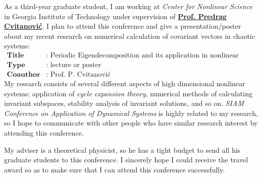 \documentclass[10pt,stdletter,dateno,sigleft]{newlfm} %
\begin{document}
\begin{newlfm}

As a third-year graduate student, I am working at \textit{Center for Nonlinear Science} 
in Georgia Institute of Technology under supervision of  
\href{http://www.cns.gatech.edu/~predrag/}{\textbf{Prof. Predrag Cvitanovi\'c}}. 
I plan to attend this conference and give a presentation/poster about my recent research
on numerical calculation of covariant vectors in chaotic systems:
\begin{align*}
  \textbf{Title} & \text{: Periodic Eigendecomposition and its application in nonlinear dynamics} \\
  \textbf{Type} & \text{: lecture or poster} \\
  \textbf{Coauthor} & \text{: Prof. P. Cvitanovi\'c}
\end{align*}
My research consists of several different aspects of high dimensional nonlinear
systems: application of 
\textit{cycle expansion theory}, numerical 
methods of calculating invariant subspaces, stability 
analysis of invariant solutions, and so on.
\textit{SIAM Conference on Application of Dynamical Systems}
is highly related to my research, so I hope to communicate with other people who have
similar research interest by attending this conference.
 

My adviser is a theoretical physicist, so he has a tight budget to send all his 
graduate students to this conference. I sincerely hope I could receive the 
travel award so as to make sure that I can attend this conference successfully. 


\end{newlfm}
\end{document}
